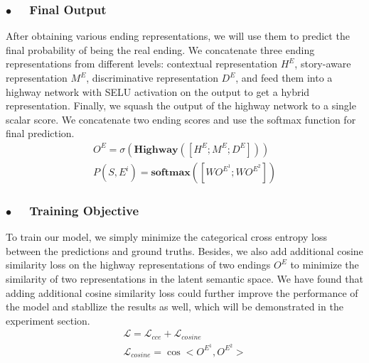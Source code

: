 \documentclass[letterpaper]{article} %
\begin{document}
\subsubsection*{$\bullet$~~ Final Output}
After obtaining various ending representations, we will use them to predict the final probability of being the real ending.
We concatenate three ending representations from different levels: contextual representation $H^E$, story-aware representation $M^E$, discriminative representation $D^E$, and feed them into a highway network \cite{srivastava-etal-2015} with SELU activation on the output to get a hybrid representation.
Finally, we squash the output of the highway network to a single scalar score.
We concatenate two ending scores and use the softmax function for final prediction.
\begin{gather}
O^E =  \sigma(\mathbf{Highway}([H^E; M^E; D^E])) \\
P(S, E^i) = \mathbf{softmax}([W O^{E^{1}}; W O^{E^{2}}])
\end{gather}

\subsubsection*{$\bullet$~~ Training Objective}
To train our model, we simply minimize the categorical cross entropy loss between the predictions and ground truths.
Besides, we also add additional cosine similarity loss on the highway representations of two endings $O^E$ to minimize the similarity of two representations in the latent semantic space. We have found that adding additional cosine similarity loss could further improve the performance of the model and stabllize the results as well, which will be demonstrated in the experiment section.
\begin{gather}
\mathcal{L} = \mathcal{L}_{cce} + \mathcal{L}_{cosine} \\
\mathcal{L}_{cosine} = \cos<O^{E^{1}}, O^{E^{2}}>
\end{gather}
\end{document}
